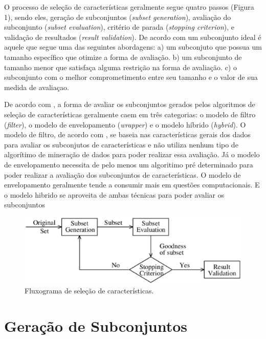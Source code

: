 O processo de seleção de características geralmente segue quatro passos (Figura 1), sendo eles, geração de subconjuntos (\textit {subset generation}), avaliação do subconjunto (\textit {subset evaluation}), critério de parada (\textit {stopping criterion}), e validação de resultados (\textit {result validation}). De acordo com  um subconjunto ideal é aquele que segue uma das seguintes abordagens: a) um subconjuto que possua um tamanho específico que otimize a forma de avaliação. b) um subconjunto de tamanho menor que satisfaça alguma restrição na forma de avaliação. c) o subconjunto com o melhor comprometimento entre seu tamanho e o valor de sua medida de avaliaçao.

De acordo com , a forma de avaliar os subconjuntos gerados pelos algoritmos de seleção de características geralmente caem em três categorias: o modelo de filtro (\textit {filter}), o modelo de envelopamento (\textit {wrapper}) e o modelo híbrido (\textit {hybrid}). O modelo de filtro, de acordo com , se baseia nas características gerais dos dados para avaliar os subconjutos de características e não utiliza nenhum tipo de algorítimo de mineração de dados para poder realizar essa avaliação. Já o modelo de envelopamento necessita de pelo menos um algoritimo pré determinado para poder realizar a avaliação dos subconjuntos de características. O modelo de envelopamento geralmente tende a consumir mais em questões computacionais. E o modelo hibrido se aproveita de ambas técnicas para poder avaliar os subconjuntos

\begin{figure}[h]
	\centering
	\label{fig02}
		\includegraphics[keepaspectratio=true,scale=0.6]{figuras/fig02.eps}
	\caption{Fluxograma de seleção de características. \cite{liu_2005}}
\end{figure}

\section{Geração de Subconjuntos}

